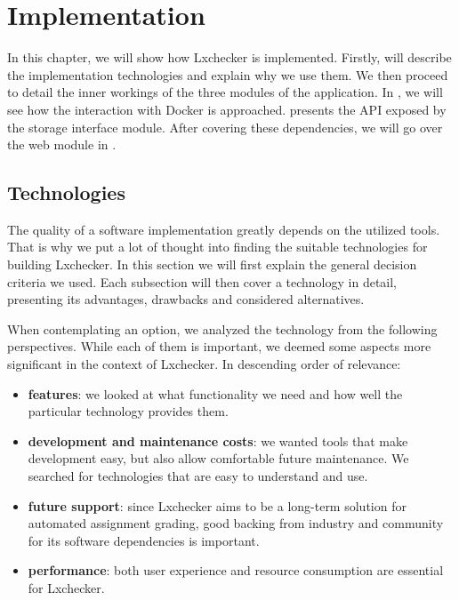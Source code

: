 \chapter{Implementation}
\label{chapter:implementation}

In this chapter, we will show how Lxchecker is implemented. Firstly,  will describe the implementation technologies and explain why we use them. We then proceed to detail the inner workings of the three modules of the application. In , we will see how the interaction with Docker is approached.  presents the API exposed by the storage interface module. After covering these dependencies, we will go over the web module in .


\section{Technologies}
\label{sec:technologies}

The quality of a software implementation greatly depends on the utilized tools. That is why we put a lot of thought into finding the suitable technologies for building Lxchecker. In this section we will first explain the general decision criteria we used. Each subsection will then cover a technology in detail, presenting its advantages, drawbacks and considered alternatives.

When contemplating an option, we analyzed the technology from the following perspectives. While each of them is important, we deemed some aspects more significant in the context of Lxchecker. In descending order of relevance:
\begin{itemize}
	\item \textbf{features}: we looked at what functionality we need and how well the particular technology provides them.
	\item \textbf{development and maintenance costs}: we wanted tools that make development easy, but also allow comfortable future maintenance. We searched for technologies that are easy to understand and use.
	\item \textbf{future support}: since Lxchecker aims to be a long-term solution for automated assignment grading, good backing from industry and community for its software dependencies is important.
	\item \textbf{performance}: both user experience and resource consumption are essential for Lxchecker.
\end{itemize}


